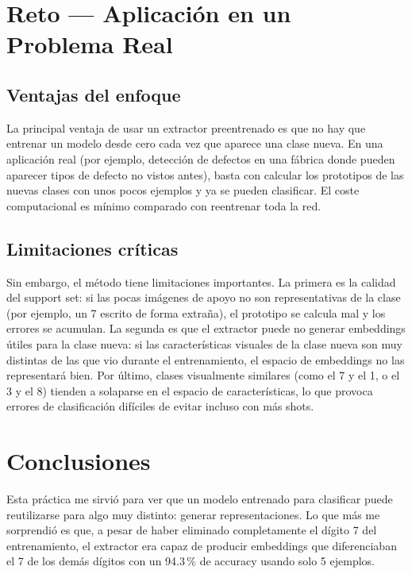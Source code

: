 \documentclass[../../__memoria.tex]{subfiles}
\begin{document}
\section[Reto: Aplicación Real]{Reto --- Aplicación en un Problema Real}

\subsection{Ventajas del enfoque}

La principal ventaja de usar un extractor preentrenado es que no hay que entrenar un modelo desde cero cada vez que aparece una clase nueva. En una aplicación real (por ejemplo, detección de defectos en una fábrica donde pueden aparecer tipos de defecto no vistos antes), basta con calcular los prototipos de las nuevas clases con unos pocos ejemplos y ya se pueden clasificar. El coste computacional es mínimo comparado con reentrenar toda la red.

\subsection{Limitaciones críticas}

Sin embargo, el método tiene limitaciones importantes. La primera es la calidad del support set: si las pocas imágenes de apoyo no son representativas de la clase (por ejemplo, un 7 escrito de forma extraña), el prototipo se calcula mal y los errores se acumulan. La segunda es que el extractor puede no generar embeddings útiles para la clase nueva: si las características visuales de la clase nueva son muy distintas de las que vio durante el entrenamiento, el espacio de embeddings no las representará bien. Por último, clases visualmente similares (como el 7 y el 1, o el 3 y el 8) tienden a solaparse en el espacio de características, lo que provoca errores de clasificación difíciles de evitar incluso con más shots.

\section*{Conclusiones}

Esta práctica me sirvió para ver que un modelo entrenado para clasificar puede reutilizarse para algo muy distinto: generar representaciones. Lo que más me sorprendió es que, a pesar de haber eliminado completamente el dígito 7 del entrenamiento, el extractor era capaz de producir embeddings que diferenciaban el 7 de los demás dígitos con un 94.3\,\% de accuracy usando solo 5 ejemplos.
\end{document}
